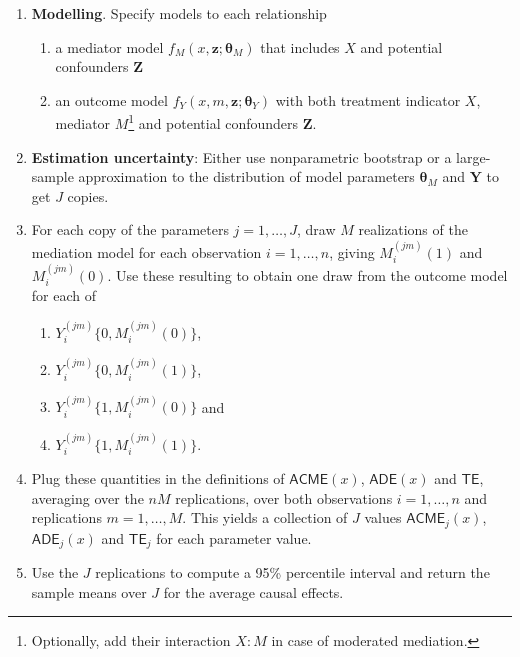 \documentclass[
  11pt,
  letterpaper,
]{scrbook}
\providecommand{\tightlist}{%
  \setlength{\itemsep}{0pt}\setlength{\parskip}{0pt}}\usepackage{longtable,booktabs,array}
\theoremstyle{definition}
\theoremstyle{definition}
\theoremstyle{remark}
\begin{document}
\begin{enumerate}
\def\labelenumi{\arabic{enumi}.}
\tightlist
\item
  \textbf{Modelling}. Specify models to each relationship

  \begin{enumerate}
  \def\labelenumii{\alph{enumii}.}
  \tightlist
  \item
    a mediator model \(f_M(x, \boldsymbol{z}; \boldsymbol{\theta}_M)\)
    that includes \(X\) and potential confounders \(\boldsymbol{Z}\)
  \item
    an outcome model
    \(f_Y(x, m, \boldsymbol{z}; \boldsymbol{\theta}_Y)\) with both
    treatment indicator \(X\), mediator \(M\)\footnote{Optionally, add
      their interaction \(X:M\) in case of moderated mediation.} and
    potential confounders \(\boldsymbol{Z}\).
  \end{enumerate}
\item
  \textbf{Estimation uncertainty}: Either use nonparametric bootstrap or
  a large-sample approximation to the distribution of model parameters
  \(\boldsymbol{\theta}_M\) and \(\boldsymbol{Y}\) to get \(J\) copies.
\item
  For each copy of the parameters \(j=1, \ldots, J\), draw \(M\)
  realizations of the mediation model for each observation
  \(i=1, \ldots, n\), giving \(M^{(jm)}_i(1)\) and \(M^{(jm)}_i(0)\).
  Use these resulting to obtain one draw from the outcome model for each
  of

  \begin{enumerate}
  \def\labelenumii{\alph{enumii}.}
  \tightlist
  \item
    \(Y_{i}^{(jm)}\{0, M^{(jm)}_i(0)\}\),
  \item
    \(Y_{i}^{(jm)}\{0, M^{(jm)}_i(1)\}\),
  \item
    \(Y_{i}^{(jm)}\{1, M^{(jm)}_i(0)\}\) and
  \item
    \(Y_{i}^{(jm)}\{1, M^{(jm)}_i(1)\}\).
  \end{enumerate}
\item
  Plug these quantities in the definitions of \(\mathsf{ACME}(x)\),
  \(\mathsf{ADE}(x)\) and \(\mathsf{TE}\), averaging over the \(nM\)
  replications, over both observations \(i=1, \ldots, n\) and
  replications \(m=1, \ldots, M\). This yields a collection of \(J\)
  values \(\mathsf{ACME}_j(x)\), \(\mathsf{ADE}_j(x)\) and
  \(\mathsf{TE}_j\) for each parameter value.
\item
  Use the \(J\) replications to compute a 95\% percentile interval and
  return the sample means over \(J\) for the average causal effects.
\end{enumerate}
\end{document}
